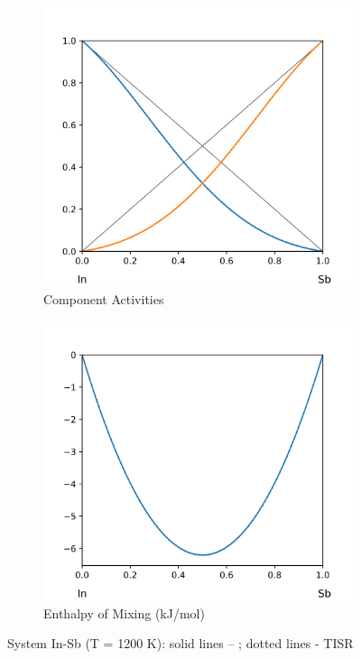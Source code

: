 \documentclass[12pt,abstract]{scrartcl}
\begin{document}
\begin{figure}[h]
\centering
\begin{subfigure}{.5\textwidth}
  \centering
  \includegraphics[width=1\linewidth]{In-Sb_Activity}
  \caption{Component Activities}
  \label{fig:sub1}
\end{subfigure}%
\begin{subfigure}{.5\textwidth}
  \centering
  \includegraphics[width=1\linewidth]{In-Sb_Enthalpy}
  \caption{Enthalpy of Mixing (kJ/mol)}
  \label{fig:sub2}
\end{subfigure}
\caption{System In-Sb (T = 1200 K): solid lines -- \cite{Ag-In_Data}; dotted lines - TISR}
\label{fig:In-Sb}
\end{figure}
\end{document}
